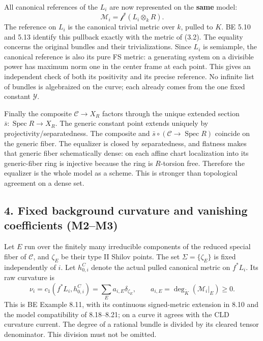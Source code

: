 \documentclass[
  10pt,
]{article}
\begin{document}
All canonical references of the \(L_i\) are now represented on the
\textbf{same} model:
\[\mathcal M_i=\mathcal f^*(L_i\otimes_kR).                              \tag{3.2}\]
The reference on \(L_i\) is the canonical trivial metric over \(k\),
pulled to \(K\). BE 5.10 and 5.13 identify this pullback exactly with
the metric of (3.2). The equality concerns the original bundles and
their trivializations. Since \(L_i\) is semiample, the canonical
reference is also its pure FS metric: a generating system on a divisible
power has maximum norm one in the center frame at each point. This gives
an independent check of both its positivity and its precise reference.
No infinite list of bundles is algebraized on the curve; each already
comes from the one fixed constant \(\mathcal Y\).

Finally the composite \(\mathcal C\to X_R\) factors through the unique
extended section \(\bar s:\operatorname{Spec}R\to X_R\). The generic
constant point extends uniquely by projectivity/separatedness. The
composite and \(\bar s\circ(\mathcal C\to\operatorname{Spec}R)\)
coincide on the generic fiber. The equalizer is closed by separatedness,
and flatness makes that generic fiber schematically dense: on each
affine chart localization into its generic-fiber ring is injective
because the ring is \(R\)-torsion free. Therefore the equalizer is the
whole model as a scheme. This is stronger than topological agreement on
a dense set.

\subsection{4. Fixed background curvature and vanishing coefficients
(M2--M3)}\label{fixed-background-curvature-and-vanishing-coefficients-m2m3}

Let \(E\) run over the finitely many irreducible components of the
reduced special fiber of \(\mathcal C\), and \(\zeta_E\) be their type
II Shilov points. The set \(\Sigma=\{\zeta_E\}\) is fixed independently
of \(i\). Let \(h_{0,i}^C\) denote the actual pulled canonical metric on
\(f^*L_i\). Its raw curvature is
\[\nu_i=c_1(f^*L_i,h_{0,i}^C)=\sum_E a_{i,E}\delta_{\zeta_E},\qquad
a_{i,E}=\deg_{\widetilde K}(\mathcal M_i|_E)\ge0.                       \tag{4.1}\]
This is BE Example 8.11, with its continuous signed-metric extension in
8.10 and the model compatibility of 8.18--8.21; on a curve it agrees
with the CLD curvature current. The degree of a rational bundle is
divided by its cleared tensor denominator. This division must not be
omitted.
\end{document}
